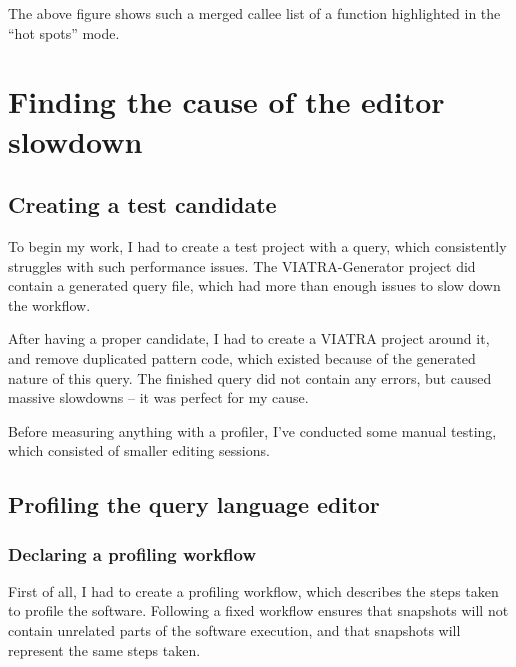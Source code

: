 \documentclass[11pt,a4paper,oneside]{report}
\begin{document}
The above figure shows such a merged callee list of a function highlighted in
the ``hot spots'' mode.

\chapter{Finding the cause of the editor slowdown}

\section{Creating a test candidate}
To begin my work, I had to create a test project with a query, which
consistently struggles with such performance issues. The VIATRA-Generator
project\cite{github-viatra-generator} did contain a generated query file, which
had more than enough issues to slow down the workflow.

After having a proper candidate, I had to create a VIATRA
project\cite{github-viatra-vql-slowdown-example} around it, and
remove duplicated pattern code, which existed because of the generated nature
of this query. The finished query did not contain any errors, but caused massive
slowdowns -- it was perfect for my cause.

Before measuring anything with a profiler, I've conducted some manual testing,
which consisted of smaller editing sessions.

\section{Profiling the query language editor}
\subsection{Declaring a profiling workflow}
First of all, I had to create a profiling workflow, which describes the steps
taken to profile the software. Following a fixed workflow ensures that snapshots
will not contain unrelated parts of the software execution, and that snapshots
will represent the same steps taken.
\end{document}
